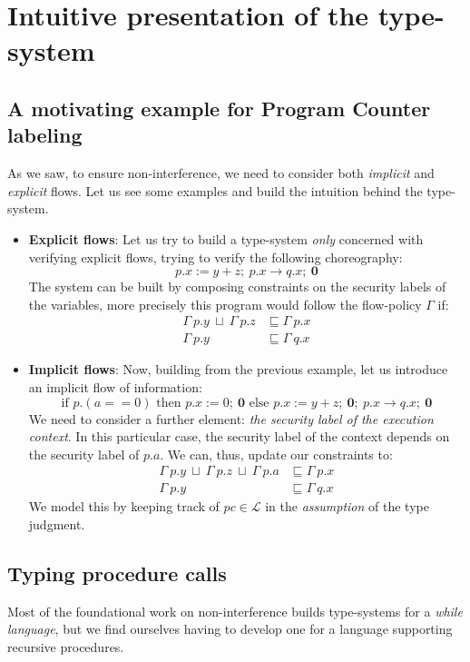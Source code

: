 \documentclass[12pt,a4paper,twoside]{book}
\begin{document}
\section{Intuitive presentation of the type-system}
\label{type:intuitive}
\subsection{A motivating example for Program Counter labeling}
As we saw, to ensure non-interference, we need to consider both \textit{implicit} and \textit{explicit} flows.
Let us see some examples and build the intuition behind the type-system.
\begin{itemize}
	\item{\textbf{Explicit flows}}: Let us try to build a type-system \textit{only} concerned with verifying explicit flows, trying to verify the following choreography:
$$ p.x := y + z; ~ p.x \rightarrow q.x; ~ \boldsymbol{0} $$
	The system can be built by composing constraints on the security labels of the variables, more precisely this program would follow the flow-policy $\Gamma$ if:
	\begin{align*}
		\Gamma~p.y ~\sqcup~ \Gamma~p.z &\sqsubseteq \Gamma~p.x\\
		\Gamma~p.y &\sqsubseteq \Gamma~q.x
	\end{align*}
	\item{\textbf{Implicit flows}}: Now, building from the previous example, let us introduce an implicit flow of information:
	$$ \text{if } p.(a == 0) \text{ then } p.x := 0; ~ \boldsymbol{0} \text{ else } p.x := y + z; ~ \boldsymbol{0}; ~ p.x \rightarrow q.x; ~ \boldsymbol{0} $$
	We need to consider a further element: \textit{the security label of the execution context}. In this particular case, the security label of the context depends on the security label of $p.a$. We can, thus, update our constraints to:
	\begin{align*}
		\Gamma~p.y~\sqcup~\Gamma~p.z~\sqcup~\Gamma~p.a &\sqsubseteq \Gamma~p.x\\
		\Gamma~p.y &\sqsubseteq \Gamma~q.x
	\end{align*}
	We model this by keeping track of $pc \in \mathscr{L}$ in the \textit{assumption} of the type judgment.
\end{itemize}

\subsection{Typing procedure calls}
Most of the foundational work on non-interference\cite{sabelfeld2003language} builds type-systems for a \textit{while language}, but we find ourselves having to develop one for a language supporting recursive procedures.
\end{document}
